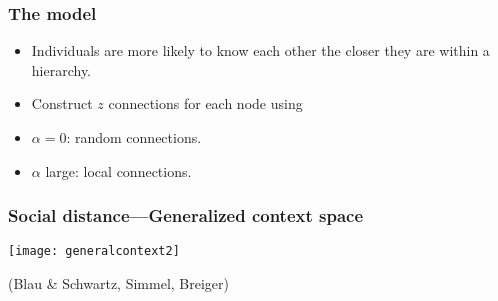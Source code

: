 \begin{frame}
  \frametitle{The model}

  \begin{itemize}
  \item<1-> 
    Individuals are more
    likely to know each other the closer they are
    within a hierarchy.
  \item<2-> 
    Construct $z$ connections for each node
    using
  \item<3-> 
    \alert{$\alpha=0$}: random connections.
  \item<4-> 
    \alert{$\alpha$ large}: local connections.
  \end{itemize}

\end{frame}


\begin{frame}
  \frametitle{Social distance---Generalized context space}

  \centering
  \texttt{[image: generalcontext2]}

  (Blau \& Schwartz, Simmel, Breiger)
\end{frame}

% 
% 
% 
% 
% 
% 

